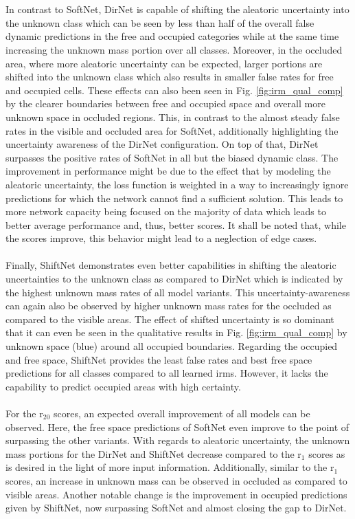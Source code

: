 \\\\
In contrast to SoftNet, DirNet is capable of shifting the aleatoric uncertainty into the unknown class which can be seen by less than half of the overall false dynamic predictions in the free and occupied categories while at the same time increasing the unknown mass portion over all classes. Moreover, in the occluded area, where more aleatoric uncertainty can be expected, larger portions are shifted into the unknown class which also results in smaller false rates for free and occupied cells. These effects can also been seen in Fig. \ref{fig:irm_qual_comp} by the clearer boundaries between free and occupied space and overall more unknown space in occluded regions. This, in contrast to the almost steady false rates in the visible and occluded area for SoftNet, additionally highlighting the uncertainty awareness of the DirNet configuration. On top of that, DirNet surpasses the positive rates of SoftNet in all but the biased dynamic class. The improvement in performance might be due to the effect that by modeling the aleatoric uncertainty, the loss function is weighted in a way to increasingly ignore predictions for which the network cannot find a sufficient solution. This leads to more network capacity being focused on the majority of data which leads to better average performance and, thus, better scores. It shall be noted that, while the scores improve, this behavior might lead to a neglection of edge cases.
\\\\
Finally, ShiftNet demonstrates even better capabilities in shifting the aleatoric uncertainties to the unknown class as compared to DirNet which is indicated by the highest unknown mass rates of all model variants. This uncertainty-awareness can again also be observed by higher unknown mass rates for the occluded as compared to the visible areas. The effect of shifted uncertainty is so dominant that it can even be seen in the qualitative results in Fig. \ref{fig:irm_qual_comp} by unknown space (blue) around all occupied boundaries. Regarding the occupied and free space, ShiftNet provides the least false rates and best free space predictions for all classes compared to all learned \gls{irm}s. However, it lacks the capability to predict occupied areas with high certainty.
\\\\
For the \gls{r}$_{20}$ scores, an expected overall improvement of all models can be observed. Here, the free space predictions of SoftNet even improve to the point of surpassing the other variants. With regards to aleatoric uncertainty, the unknown mass portions for the DirNet and ShiftNet decrease compared to the \gls{r}$_1$ scores as is desired in the light of more input information. Additionally, similar to the \gls{r}$_1$ scores, an increase in unknown mass can be observed in occluded as compared to visible areas. Another notable change is the improvement in occupied predictions given by ShiftNet, now surpassing SoftNet and almost closing the gap to DirNet. 
